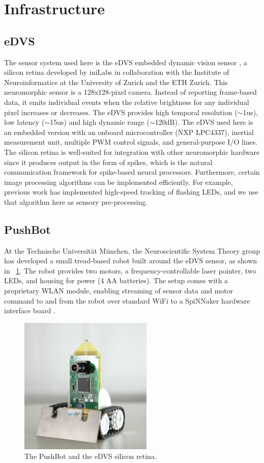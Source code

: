 \documentclass[conference]{IEEEtran}
\begin{document}
\section{Infrastructure}
\label{infrastructure}

\subsection{eDVS}
The sensor system used here is the eDVS embedded dynamic vision 
sensor \cite{conradt2009embedded}, a silicon retina developed by iniLabs in 
collaboration with the Institute of Neuroinformatics at the University of 
Zurich and the ETH Zurich. This neuromorphic sensor is a 128x128-pixel camera. 
Instead of reporting frame-based data, it emits individual events when the 
relative brightness for any individual pixel increases or decreases. The eDVS 
provides high temporal resolution ($\sim$1us), low latency ($\sim$15us) and high dynamic 
range ($\sim$120dB). The eDVS used here is an embedded version with an onboard 
microcontroller (NXP LPC4337), inertial measurement unit, multiple PWM control 
signals, and general-purpose I/O lines. The silicon retina is well-suited for 
integration with other neuromorphic hardware since it produces output in the 
form of spikes, which is the natural communication framework for spike-based 
neural processors. Furthermore, certain image processing algorithms can be 
implemented efficiently. For example, previous work \cite{muller2011miniature} 
has implemented high-speed tracking of flashing LEDs, and we use that algorithm 
here as sensory pre-processing.


\subsection{PushBot}
At the Technische Universit{\"a}t M{\"u}nchen, the Neuroscientific
System Theory group has developed a small tread-based robot built around the 
eDVS sensor, as shown in \figurename~\ref{fig_sim}. The robot provides two motors, a frequency-controllable laser pointer, two LEDs, and housing for power (4 AA batteries). The setup comes with a proprietary WLAN module, enabling streaming of sensor data and motor command to and from the robot over standard WiFi to a SpiNNaker hardware interface board \cite{denk2013}.

\begin{figure}[!t]
\centering
\includegraphics[width=2.5in]{Pushbot1CroppedCropped.jpg}
\caption{The PushBot and the eDVS silicon retina.}
\label{fig_sim}
\end{figure}
\end{document}
